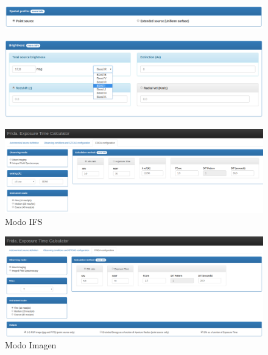 \begin{figure}[h]
    \centering
    \includegraphics[scale=0.25]{figs/spatial-profile}
    \label{fig:spatial}
\end{figure}
\begin{figure}[h]
    \centering
    \includegraphics[scale=0.25]{figs/brightness}
    \label{fig:brightness}
\end{figure}
\begin{figure}[h]
    \centering
    \includegraphics[scale=0.2]{figs/ifs-mode}
    \caption{Modo IFS}
    \label{fig:ifs-mode}
\end{figure}
\begin{figure}[h]
    \centering
    \includegraphics[scale=0.2]{figs/image-mode}
    \caption{Modo Imagen}
    \label{fig:image-mode}
\end{figure}




